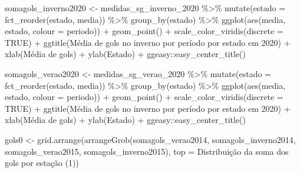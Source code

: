 \documentclass[
]{article}
\newenvironment{Shaded}{\begin{snugshade}}{\end{snugshade}}
\newcommand{\AttributeTok}[1]{\textcolor[rgb]{0.77,0.63,0.00}{#1}}
\newcommand{\ConstantTok}[1]{\textcolor[rgb]{0.00,0.00,0.00}{#1}}
\newcommand{\FunctionTok}[1]{\textcolor[rgb]{0.00,0.00,0.00}{#1}}
\newcommand{\NormalTok}[1]{#1}
\newcommand{\OtherTok}[1]{\textcolor[rgb]{0.56,0.35,0.01}{#1}}
\newcommand{\SpecialCharTok}[1]{\textcolor[rgb]{0.00,0.00,0.00}{#1}}
\newcommand{\StringTok}[1]{\textcolor[rgb]{0.31,0.60,0.02}{#1}}
\begin{document}
\begin{Shaded}
\begin{Highlighting}[]
\NormalTok{somagols\_inverno2020 }\OtherTok{\textless{}{-}}\NormalTok{ medidas\_sg\_inverno\_2020 }\SpecialCharTok{\%\textgreater{}\%} \FunctionTok{mutate}\NormalTok{(}\AttributeTok{estado =} \FunctionTok{fct\_reorder}\NormalTok{(estado, media)) }\SpecialCharTok{\%\textgreater{}\%}
  \FunctionTok{group\_by}\NormalTok{(estado) }\SpecialCharTok{\%\textgreater{}\%}
  \FunctionTok{ggplot}\NormalTok{(}\FunctionTok{aes}\NormalTok{(media, estado, }\AttributeTok{colour =}\NormalTok{ periodo)) }\SpecialCharTok{+} \FunctionTok{geom\_point}\NormalTok{() }\SpecialCharTok{+}
  \FunctionTok{scale\_color\_viridis}\NormalTok{(}\AttributeTok{discrete =} \ConstantTok{TRUE}\NormalTok{) }\SpecialCharTok{+}
  \FunctionTok{ggtitle}\NormalTok{(}\StringTok{\textquotesingle{}Média de gols no inverno por período por estado em 2020\textquotesingle{}}\NormalTok{) }\SpecialCharTok{+} 
  \FunctionTok{xlab}\NormalTok{(}\StringTok{\textquotesingle{}Média de gols\textquotesingle{}}\NormalTok{) }\SpecialCharTok{+} \FunctionTok{ylab}\NormalTok{(}\StringTok{\textquotesingle{}Estado\textquotesingle{}}\NormalTok{) }\SpecialCharTok{+}
\NormalTok{  ggeasy}\SpecialCharTok{::}\FunctionTok{easy\_center\_title}\NormalTok{() }

\NormalTok{somagols\_verao2020 }\OtherTok{\textless{}{-}}\NormalTok{ medidas\_sg\_verao\_2020 }\SpecialCharTok{\%\textgreater{}\%} \FunctionTok{mutate}\NormalTok{(}\AttributeTok{estado =} \FunctionTok{fct\_reorder}\NormalTok{(estado, media)) }\SpecialCharTok{\%\textgreater{}\%} 
  \FunctionTok{group\_by}\NormalTok{(estado) }\SpecialCharTok{\%\textgreater{}\%}
  \FunctionTok{ggplot}\NormalTok{(}\FunctionTok{aes}\NormalTok{(media, estado, }\AttributeTok{colour =}\NormalTok{ periodo)) }\SpecialCharTok{+} \FunctionTok{geom\_point}\NormalTok{() }\SpecialCharTok{+}
  \FunctionTok{scale\_color\_viridis}\NormalTok{(}\AttributeTok{discrete =} \ConstantTok{TRUE}\NormalTok{) }\SpecialCharTok{+}
  \FunctionTok{ggtitle}\NormalTok{(}\StringTok{\textquotesingle{}Média de gols no inverno por período por estado em 2020\textquotesingle{}}\NormalTok{) }\SpecialCharTok{+} 
  \FunctionTok{xlab}\NormalTok{(}\StringTok{\textquotesingle{}Média de gols\textquotesingle{}}\NormalTok{) }\SpecialCharTok{+} \FunctionTok{ylab}\NormalTok{(}\StringTok{\textquotesingle{}Estado\textquotesingle{}}\NormalTok{) }\SpecialCharTok{+}
\NormalTok{  ggeasy}\SpecialCharTok{::}\FunctionTok{easy\_center\_title}\NormalTok{() }




\NormalTok{gols0 }\OtherTok{\textless{}{-}} \FunctionTok{grid.arrange}\NormalTok{(}\FunctionTok{arrangeGrob}\NormalTok{(somagols\_verao2014, somagols\_inverno2014,}
\NormalTok{                         somagols\_verao2015, somagols\_inverno2015), }
                         \AttributeTok{top =} \StringTok{\textquotesingle{}Distribuição da soma dos gols por estação (1)\textquotesingle{}}\NormalTok{)}
\end{Highlighting}
\end{Shaded}
\end{document}
